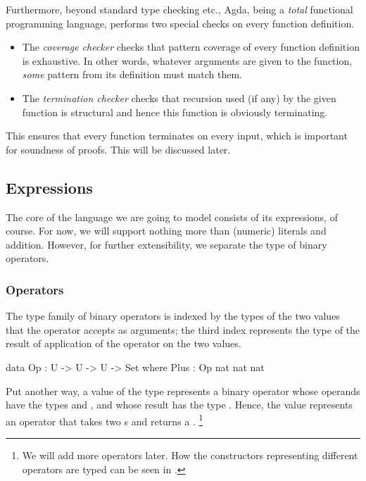 Furthermore, beyond standard type checking etc., Agda, being a \emph{total} functional
programming language, performs two special checks on every function definition.
\begin{itemize}
	\item The \emph{coverage checker} checks that pattern coverage of every
		function definition is exhaustive. In other words, whatever arguments
		are given to the function, \emph{some} pattern from its definition must match
		them.
	\item The \emph{termination checker} checks that recursion used (if any) by the
		given function is structural and hence this function is obviously terminating.
\end{itemize}
This ensures that every function terminates on every input, which is important for soundness
of proofs. This will be discussed later.


\subsection{Expressions}

The core of the language we are going to model consists of its expressions, of
course. For now, we will support nothing more than (numeric) literals and addition.
However, for further extensibility, we separate the type of binary operators.

\subsubsection{Operators}

The type family of binary operators is indexed by the types of the two values that
the operator accepts as arguments; the third index represents the type of
the result of application of the operator on the two values.

\begin{code}
  data Op : U -> U -> U -> Set where
    Plus : Op nat nat nat
\end{code}

\noindent Put another way, a value of the type  represents
a binary operator whose operands have the types  and ,
and whose result has the type . Hence, the value 
represents an operator that takes two s and returns a .%
\footnote{We will add more operators later. How the constructors representing
different operators are typed can be seen in .}

